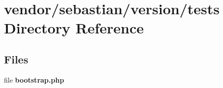 \section{vendor/sebastian/version/tests Directory Reference}
\label{dir_580f8a2f13510220e49f698f6518ee89}
\subsection*{Files}
\begin{DoxyCompactItemize}
\item 
file {\bf bootstrap.\+php}
\end{DoxyCompactItemize}

